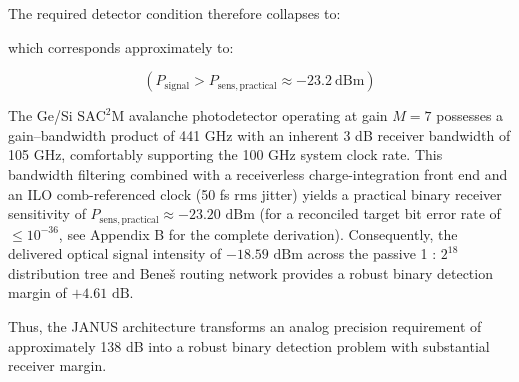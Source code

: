 \documentclass[journal]{IEEEtran}
\begin{document}
\begin{center}
\end{center}

The required detector condition therefore collapses to:

\begin{center}
\label{eq:binary_condition}
\end{center}

which corresponds approximately to:

\begin{center}
\end{center}

\begin{equation}
\left(
P_{\mathrm{signal}} > P_{\mathrm{sens,practical}}
\approx -23.2~\mathrm{dBm}
\right)
\end{equation}

The Ge/Si $\mathrm{SAC^2M}$ avalanche photodetector operating at gain $M = 7$ possesses a gain--bandwidth product of 441 GHz with an inherent 3 dB receiver bandwidth of 105 GHz, comfortably supporting the 100 GHz system clock rate. This bandwidth filtering combined with a receiverless charge-integration front end and an ILO comb-referenced clock (50 fs rms jitter) yields a practical binary receiver sensitivity of $P_{\mathrm{sens,practical}} \approx -23.20\text{ dBm}$ (for a reconciled target bit error rate of $\le 10^{-36}$, see Appendix B for the complete derivation). Consequently, the delivered optical signal intensity of $-18.59\text{ dBm}$ across the passive 1 : $2^{18}$ distribution tree and Beneš routing network provides a robust binary detection margin of $+4.61\text{ dB}$.

Thus, the JANUS architecture transforms an analog precision requirement of approximately 138 dB into a robust binary detection problem with substantial receiver margin.
\end{document}
